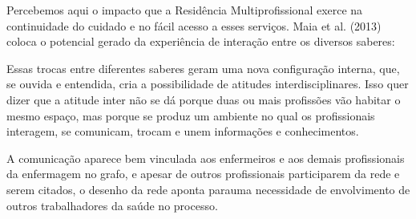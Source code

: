 Percebemos aqui o impacto que a Residência Multiprofissional exerce na continuidade do cuidado e no fácil acesso a esses serviços. Maia et al. (2013) \cite{} coloca o potencial gerado da experiência de interação entre os diversos saberes:

Essas trocas entre diferentes saberes geram uma nova configuração interna, que, se ouvida e entendida, cria a possibilidade de atitudes interdisciplinares. Isso quer dizer que a atitude inter não se dá porque duas ou mais profissões vão habitar o mesmo espaço, mas porque se produz um ambiente no qual os profissionais interagem, se comunicam, trocam e unem informações e conhecimentos.

A comunicação aparece bem vinculada aos enfermeiros e aos demais profissionais da enfermagem no grafo, e apesar de outros profissionais participarem da rede e serem citados, o desenho da rede aponta parauma necessidade de envolvimento de outros trabalhadores da saúde no processo.